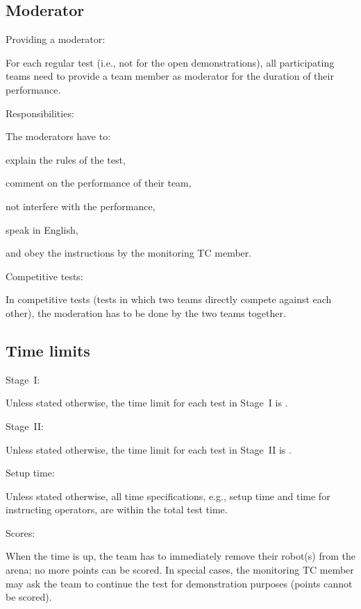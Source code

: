 \subsection{Moderator}\label{rule:moderator}
\begin{enumerate}
{\bf\item Providing a moderator:} For each regular test (i.e., not for the open demonstrations), 
all participating teams need to provide a team member as moderator for the duration of their performance. 
{\bf\item Responsibilities:} The moderators have to:
  \begin{compactitem}
  \item explain the rules of the test, 
  \item comment on the performance of their team, 
  \item not interfere with the performance, 
  \item speak in English, 
  \item and obey the instructions by the monitoring TC member.
  \end{compactitem}
{\bf\item Competitive tests:} In competitive tests (tests in which two teams directly compete against each other),
the moderation has to be done by the two teams together.
\end{enumerate}


\subsection{Time limits}\label{rule:time_limits}
\begin{enumerate}
{\bf\item Stage~I:} Unless stated otherwise, the time limit for each test in Stage~I is .
{\bf\item Stage~II:} Unless stated otherwise, the time limit for each test in Stage~II is .
{\bf\item Setup time:} Unless stated otherwise, all time specifications, e.g., setup time and time for instructing operators, 
 are within the total test time. 
{\bf\item Scores:} When the time is up, the team has to immediately remove their robot(s) from the arena; no more points can be scored.
In special cases, the monitoring TC member may ask the team to continue the test for demonstration purposes (points cannot be scored). 
\end{enumerate}



